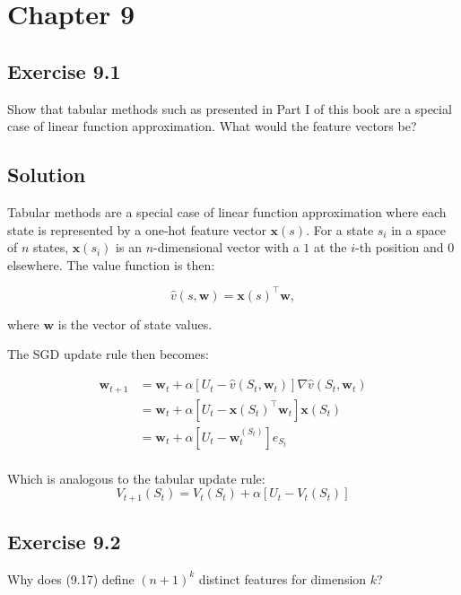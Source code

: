 \section*{Chapter 9}

\subsection*{Exercise 9.1}

Show that tabular methods such as presented in Part I of this book are a special case of linear function approximation. What would the feature vectors be?

\subsection*{Solution}

Tabular methods are a special case of linear function approximation where each state is represented by a one-hot feature vector $\mathbf{x}(s)$. For a state $s_i$ in a space of $n$ states, $\mathbf{x}(s_i)$ is an $n$-dimensional vector with a $1$ at the $i$-th position and $0$ elsewhere. The value function is then:

\[
\hat{v}(s, \mathbf{w}) = \mathbf{x}(s)^\top \mathbf{w},
\]

where $\mathbf{w}$ is the vector of state values.

The SGD update rule then becomes:

\begin{align*}
    \mathbf{w}_{t+1} &= \mathbf{w}_t + \alpha \left[ U_t - \hat{v}(S_t, \mathbf{w}_t) \right] \nabla \hat{v}(S_t, \mathbf{w}_t) \\
    &= \mathbf{w}_t + \alpha \left[ U_t - \mathbf{x}(S_t)^\top \mathbf{w}_t \right] \mathbf{x}(S_t) \\
    &= \mathbf{w}_t + \alpha \left[ U_t - \mathbf{w}_t^{(S_t)}  \right] e_{S_t} \\
\end{align*}

Which is analogous to the tabular update rule:
\[
V_{t+1}(S_t) = V_t(S_t) + \alpha \left[ U_t - V_t(S_t) \right]
\]



\subsection*{Exercise 9.2}

Why does (9.17) define $(n + 1)^k$ distinct features for dimension $k$?

